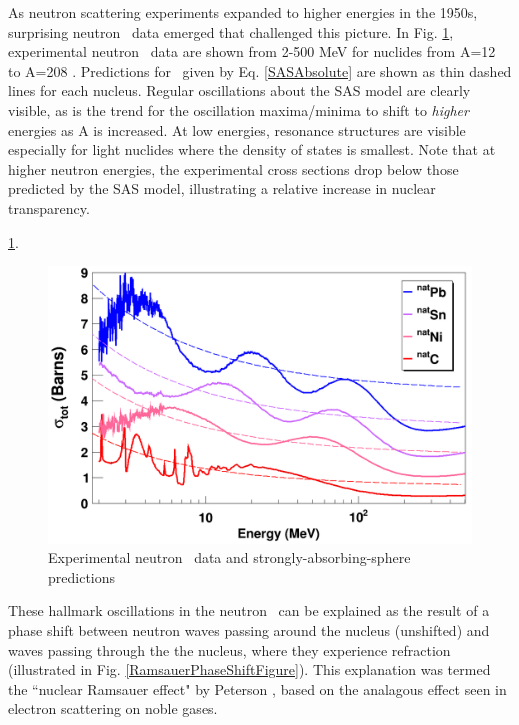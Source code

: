 As neutron scattering experiments expanded to higher energies in the 1950s, surprising 
neutron \tot\ data emerged that challenged this picture. In Fig.
\ref{SASphereVsExperiment}, experimental neutron \tot\ data are shown from 2-500
MeV for nuclides from A=12 to A=208 \cite{Finlay1993, Schwartz1974, Poenitz1983, Abfalterer2000, 
Abfalterer2001}. Predictions for \tot\ given by Eq. \ref{SASAbsolute} are shown as thin dashed 
lines for each nucleus. Regular oscillations about the SAS model are clearly
visible, as is the trend for the oscillation maxima/minima to shift to \textit{higher} energies as 
A is increased. At low energies, resonance structures are visible especially for light nuclides 
where the density of states is smallest. Note that at higher neutron energies, the experimental
cross sections drop below those predicted by the SAS model, illustrating
a relative increase in nuclear transparency.

 \ref{SASphereVsExperiment}.

\begin{figure}
    \includegraphics[scale=0.4]{figures/SASphereVsExperiment.png}
    \caption{Experimental neutron \tot\ data and strongly-absorbing-sphere predictions}
    \label{SASphereVsExperiment}
\end{figure}

These hallmark oscillations in the neutron \tot\ can be explained as the result
of a phase shift between 
neutron waves passing around the nucleus (unshifted) and waves passing
through the the nucleus, where they experience refraction
(illustrated in Fig. \ref{RamsauerPhaseShiftFigure}). This explanation was termed the ``nuclear 
Ramsauer effect" by Peterson \cite{Peterson1962}, based on the analagous effect seen in 
electron scattering on noble gases.

